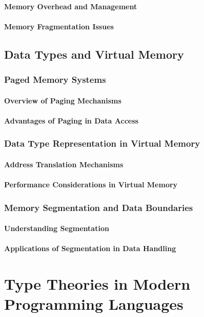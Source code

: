 \documentclass[12pt, oneside]{book}
\begin{document}
\subsubsection{Memory Overhead and Management}
\subsubsection{Memory Fragmentation Issues}
\section{Data Types and Virtual Memory}
\subsection{Paged Memory Systems}
\subsubsection{Overview of Paging Mechanisms}
\subsubsection{Advantages of Paging in Data Access}
\subsection{Data Type Representation in Virtual Memory}
\subsubsection{Address Translation Mechanisms}
\subsubsection{Performance Considerations in Virtual Memory}
\subsection{Memory Segmentation and Data Boundaries}
\subsubsection{Understanding Segmentation}
\subsubsection{Applications of Segmentation in Data Handling}

\chapter{Type Theories in Modern Programming Languages}
\end{document}
